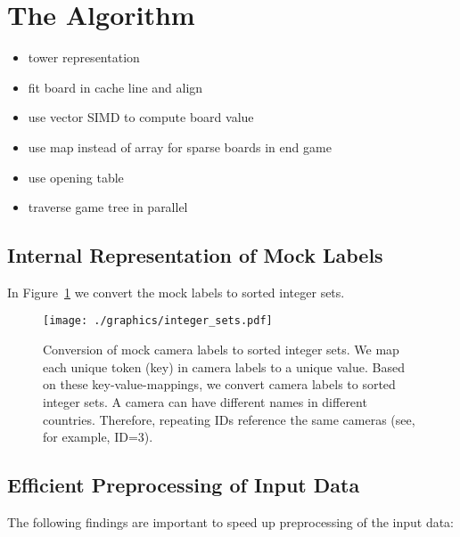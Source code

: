 \documentclass[sigconf]{acmart}
\begin{document}
\section{The Algorithm}
\begin{itemize}
  \item tower representation
  \item fit board in cache line and align
  \item use vector SIMD to compute board value
  \item use map instead of array for sparse boards in end game
  \item use opening table
  \item traverse game tree in parallel
\end{itemize}

\subsection{Internal Representation of Mock Labels}
\label{sub:sec:internal}

In Figure~\ref{fig:integer:sets} we convert the mock labels to sorted integer sets.



\begin{figure}[htbp]
  \centering
  \texttt{[image: ./graphics/integer\_sets.pdf]}
  \caption{Conversion of mock camera labels to sorted integer sets. 
We map each unique token (key) in camera labels to a unique value. 
Based on these key-value-mappings, we convert camera labels to sorted integer sets. 
A camera can have different names in different countries. Therefore, repeating IDs reference the same cameras (see, for example, ID=3).} 
  \label{fig:integer:sets}
\end{figure}

\subsection{Efficient Preprocessing of Input Data}
\label{sub:sec:preprocessing}

The following findings are important to speed up preprocessing of the input data:
\end{document}
